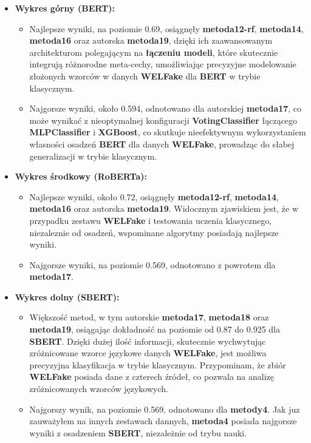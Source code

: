 \begin{itemize}
	\item \textbf{Wykres górny (BERT):}
	      \begin{itemize}
		      \item Najlepsze wyniki, na poziomie 0.69, osiągnęły \textbf{metoda12-rf}, \textbf{metoda14}, \textbf{metoda16} oraz autorska \textbf{metoda19}, dzięki ich zaawansowanym architekturom polegającym na \textbf{łączeniu modeli}, które skutecznie integrują różnorodne meta-cechy, umożliwiając precyzyjne modelowanie złożonych wzorców w danych \textbf{WELFake} dla \textbf{BERT} w trybie klasycznym.
		      \item Najgorsze wyniki, około 0.594, odnotowano dla autorskiej \textbf{metoda17}, co może wynikać z nieoptymalnej konfiguracji \textbf{VotingClassifier} łączącego \textbf{MLPClassifier} i \textbf{XGBoost}, co skutkuje nieefektywnym wykorzystaniem własności osadzeń \textbf{BERT} dla danych \textbf{WELFake}, prowadząc do słabej generalizacji w trybie klasycznym.
	      \end{itemize}

	\item \textbf{Wykres środkowy (RoBERTa):}
	      \begin{itemize}
		      \item Najlepsze wyniki, około 0.72, osiągnęły \textbf{metoda12-rf}, \textbf{metoda14}, \textbf{metoda16} oraz autorska \textbf{metoda19}. Widocznym zjawiskiem jest, że w przypadku zestawu \textbf{WELFake} i testowania uczenia klasycznego, niezaleznie od osadzeń, wspominane algorytmy posiadają najlepsze wyniki.
		      \item Najgorsze wyniki, na poziomie 0.569, odnotowano z powrotem dla \textbf{metoda17}.
	      \end{itemize}

	\item \textbf{Wykres dolny (SBERT):}
	      \begin{itemize}
		      \item Większość metod, w tym autorskie \textbf{metoda17}, \textbf{metoda18} oraz \textbf{metoda19}, osiągając dokładność na poziomie od 0.87 do 0.925 dla \textbf{SBERT}. Dzięki dużej ilość informacji, skutecznie wychwytując zróżnicowane wzorce językowe danych \textbf{WELFake}, jest możliwa precyzyjna klasyfikacja w trybie klasycznym. Przypominam, że zbiór \textbf{WELFake} posiada dane z czterech źródeł, co pozwala na analizę zróżnicowanych wzorców językowych.
		      \item Najgorszy wynik, na poziomie 0.569, odnotowano dla \textbf{metody4}. Jak juz zauważyłem na innych zestawach dannych, \textbf{metoda4} posiada najgorsze wyniki z osadzeniem \textbf{SBERT}, niezależnie od trybu nauki.
	      \end{itemize}
\end{itemize}


